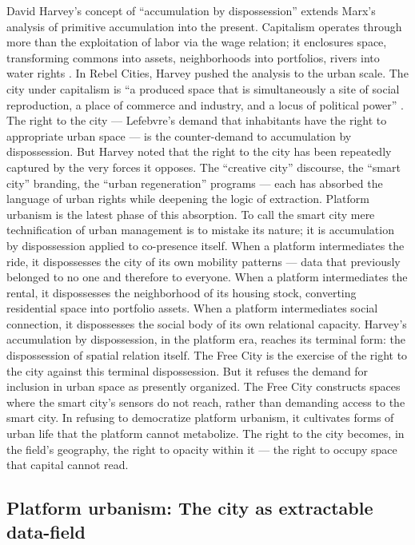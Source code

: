 David Harvey’s concept of “accumulation by dispossession” extends Marx’s analysis of primitive accumulation into the present. Capitalism operates through more than the exploitation of labor via the wage relation; it enclosures space, transforming commons into assets, neighborhoods into portfolios, rivers into water rights \cite[pp.~137--182]{harvey_2003}. In Rebel Cities, Harvey pushed the analysis to the urban scale. The city under capitalism is “a produced space that is simultaneously a site of social reproduction, a place of commerce and industry, and a locus of political power” \cite[pp.~3--24]{harvey_2012}. The right to the city — Lefebvre’s demand that inhabitants have the right to appropriate urban space — is the counter-demand to accumulation by dispossession. But Harvey noted that the right to the city has been repeatedly captured by the very forces it opposes. The “creative city” discourse, the “smart city” branding, the “urban regeneration” programs — each has absorbed the language of urban rights while deepening the logic of extraction. Platform urbanism is the latest phase of this absorption. To call the smart city mere technification of urban management is to mistake its nature; it is accumulation by dispossession applied to co-presence itself. When a platform intermediates the ride, it dispossesses the city of its own mobility patterns — data that previously belonged to no one and therefore to everyone. When a platform intermediates the rental, it dispossesses the neighborhood of its housing stock, converting residential space into portfolio assets. When a platform intermediates social connection, it dispossesses the social body of its own relational capacity. Harvey’s accumulation by dispossession, in the platform era, reaches its terminal form: the dispossession of spatial relation itself. The Free City is the exercise of the right to the city against this terminal dispossession. But it refuses the demand for inclusion in urban space as presently organized. The Free City constructs spaces where the smart city’s sensors do not reach, rather than demanding access to the smart city. In refusing to democratize platform urbanism, it cultivates forms of urban life that the platform cannot metabolize. The right to the city becomes, in the field’s geography, the right to opacity within it — the right to occupy space that capital cannot read.

\subsection{Platform urbanism: The city as extractable data-field}

